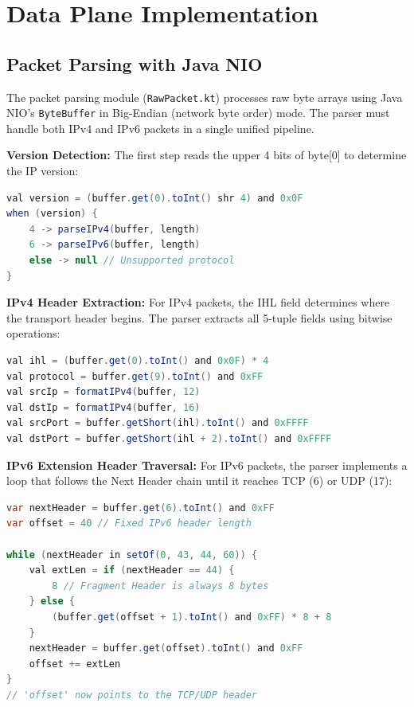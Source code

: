
\section{Data Plane Implementation}
\label{sec:data_plane_impl}

\subsection{Packet Parsing with Java NIO}

The packet parsing module (\texttt{RawPacket.kt}) processes raw byte arrays using Java NIO's \texttt{ByteBuffer} in Big-Endian (network byte order) mode. The parser must handle both IPv4 and IPv6 packets in a single unified pipeline.

\textbf{Version Detection:} The first step reads the upper 4 bits of byte[0] to determine the IP version:

\begin{lstlisting}[language=Java, caption={IP version detection}]
val version = (buffer.get(0).toInt() shr 4) and 0x0F
when (version) {
    4 -> parseIPv4(buffer, length)
    6 -> parseIPv6(buffer, length)
    else -> null // Unsupported protocol
}
\end{lstlisting}

\textbf{IPv4 Header Extraction:} For IPv4 packets, the IHL field determines where the transport header begins. The parser extracts all 5-tuple fields using bitwise operations:

\begin{lstlisting}[language=Java, caption={IPv4 header parsing}]
val ihl = (buffer.get(0).toInt() and 0x0F) * 4
val protocol = buffer.get(9).toInt() and 0xFF
val srcIp = formatIPv4(buffer, 12)
val dstIp = formatIPv4(buffer, 16)
val srcPort = buffer.getShort(ihl).toInt() and 0xFFFF
val dstPort = buffer.getShort(ihl + 2).toInt() and 0xFFFF
\end{lstlisting}

\textbf{IPv6 Extension Header Traversal:} For IPv6 packets, the parser implements a loop that follows the Next Header chain until it reaches TCP (6) or UDP (17):

\begin{lstlisting}[language=Java, caption={IPv6 extension header traversal}]
var nextHeader = buffer.get(6).toInt() and 0xFF
var offset = 40 // Fixed IPv6 header length

while (nextHeader in setOf(0, 43, 44, 60)) {
    val extLen = if (nextHeader == 44) {
        8 // Fragment Header is always 8 bytes
    } else {
        (buffer.get(offset + 1).toInt() and 0xFF) * 8 + 8
    }
    nextHeader = buffer.get(offset).toInt() and 0xFF
    offset += extLen
}
// 'offset' now points to the TCP/UDP header
\end{lstlisting}

